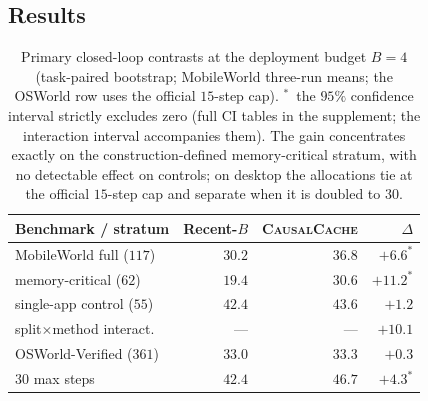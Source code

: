 \documentclass[letterpaper]{article} %
\newcommand{\method}{\textsc{CausalCache}}
\begin{document}
\subsection{Results}

\begin{table}[t]
\centering
{\small
\setlength{\tabcolsep}{3.2pt}
\begin{tabular}{@{}lrrr@{}}
\toprule
Benchmark / stratum & Recent-$B$ & \method{} & $\Delta$ \\
\midrule
MobileWorld full ($117$) & $30.2$ & $36.8$ & $+6.6^{*}$ \\
\hspace{7pt}memory-critical ($62$) & $19.4$ & $30.6$ & $+11.2^{*}$ \\
\hspace{7pt}single-app control ($55$) & $42.4$ & $43.6$ & $+1.2$ \\
\hspace{7pt}split$\times$method interact. & --- & --- & $+10.1$ \\
OSWorld-Verified ($361$) & $33.0$ & $33.3$ & $+0.3$ \\
\hspace{7pt}$30$ max steps & $42.4$ & $46.7$ & $+4.3^{*}$ \\
\bottomrule
\end{tabular}
}
\caption{Primary closed-loop contrasts at the deployment budget $B{=}4$
(task-paired bootstrap; MobileWorld three-run means; the OSWorld row uses the official $15$-step cap). $^{*}$~the $95\%$
confidence interval strictly excludes zero (full CI tables in the
supplement; the interaction interval accompanies them). The gain
concentrates exactly on the construction-defined memory-critical stratum,
with no detectable effect on controls; on desktop the allocations tie at
the official $15$-step cap and separate when it is doubled to $30$.}
\label{tab:contrast}
\end{table}
\end{document}
